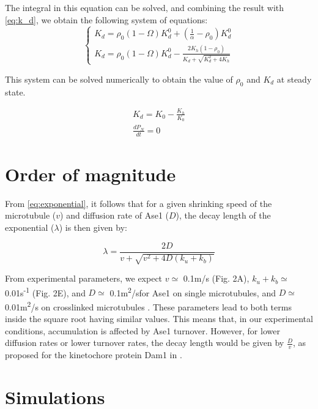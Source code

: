 \documentclass{article}
\newcommand{\ums}{\textmu m/s}
\newcommand{\umsqs}{\textmu m\textsuperscript{2}/s}
\begin{document}
The integral in this equation can be solved, and combining the result with \autoref{eq:k_d}, we obtain the following system of equations:
\begin{equation}
\begin{cases}
K_d = \rho_0(1-\Omega)K_d^0 + (\frac{1}{\alpha}-\rho_0)K_d^0\\
K_d = \rho_0(1-\Omega)K_d^0 - \frac{2K_h(1-\rho_0)}{K_d+\sqrt{K_d^2+4K_h}}
\end{cases}
\end{equation}

This system can be solved numerically to obtain the value of $\rho_0$ and $K_d$ at steady state.

\begin{gather}
\label{eq:solK_0}
K_d = K_0 - \frac{K_h}{K_0}\\ 
\label{eq:solP_0}
\frac{dP_N}{dt} = 0
\end{gather}

\section{Order of magnitude}

From \autoref{eq:exponential}, it follows that for a given shrinking speed of the microtubule ($v$) and diffusion rate of Ase1 ($D$), the decay length of the exponential ($\lambda$) is then given by:


\begin{equation}
\label{eq:decay_length}
\lambda = \frac{2D}{v+\sqrt{v^2 + 4D(k_u+k_b)}}
\end{equation}

From experimental parameters, we expect  $v\simeq$ 0.1\ums{} (Fig. 2A), $k_u+k_b\simeq$ 0.01s\textsuperscript{-1} (Fig. 2E), and $D\simeq$ 0.1\umsqs for Ase1 on single microtubules, and $D\simeq$ 0.01\umsqs{} on crosslinked microtubules \cite{Lansky2015}. These parameters lead to both terms inside the square root having similar values. This means that, in our experimental conditions, accumulation is affected by Ase1 turnover. However, for lower diffusion rates or lower turnover rates, the decay length would be given by $\frac{D}{v}$, as proposed for the kinetochore protein Dam1 in \cite{Gardner2008b}.

\section{Simulations}
\end{document}
